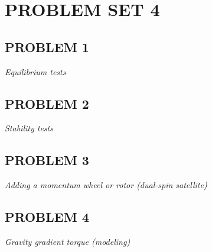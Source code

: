 \section{\Large PROBLEM SET 4}
\subsection{PROBLEM 1}
\textit{Equilibrium tests}


\subsection{PROBLEM 2}
\textit{Stability tests}


\subsection{PROBLEM 3}
\textit{Adding a momentum wheel or rotor (dual-spin satellite)}


\subsection{PROBLEM 4}
\textit{Gravity gradient torque (modeling)}
